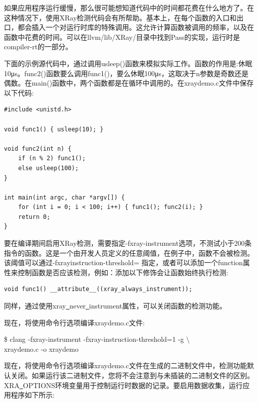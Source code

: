 
如果应用程序运行缓慢，那么很可能想知道代码中的时间都花费在什么地方了。在这种情况下，使用XRay检测代码会有所帮助。基本上，在每个函数的入口和出口，都会插入一个对运行时库的特殊调用。这允许计算函数被调用的频率，以及在函数中花费的时间。可以在llvm/lib/XRay/目录中找到Pass的实现，运行时是compiler-rt的一部分。\par

下面的示例源代码中，通过调用usleep()函数来模拟实际工作。函数的作用是:休眠10μs。func2()函数要么调用func1()，要么休眠100μs，这取决于n参数是奇数还是偶数。在main()函数中，两个函数都是在循环中调用的。在xraydemo.c文件中保存以下代码:\par

\begin{lstlisting}[caption={}]
#include <unistd.h>

void func1() { usleep(10); }

void func2(int n) {
	if (n % 2) func1();
	else usleep(100);
}

int main(int argc, char *argv[]) {
	for (int i = 0; i < 100; i++) { func1(); func2(i); }
	return 0;
}
\end{lstlisting}

要在编译期间启用XRay检测，需要指定-fxray-instrument选项，不测试小于200条指令的函数。这是一个由开发人员定义的任意阈值，在例子中，函数不会被检测。该阈值可以通过-fxrayin\allowbreak struction-threshold= 指定，或者可以添加一个function属性来控制函数是否应该检测，例如：添加以下修饰会让函数始终执行检测:\par

\begin{lstlisting}[caption={}]
void func1() __attribute__((xray_always_instrument));
\end{lstlisting}

同样，通过使用xray\underline{~}never\underline{~}instrument属性，可以关闭函数的检测功能。\par

现在，将使用命令行选项编译xraydemo.c文件:

\begin{tcolorbox}[colback=white,colframe=black]
\$ clang -fxray-instrument -fxray-instruction-threshold=1 -g $\setminus$ \\
\hspace*{1cm}xraydemo.c -o xraydemo
\end{tcolorbox}

现在，将使用命令行选项编译xraydemo.c文件在生成的二进制文件中，检测功能默认关闭。如果运行该二进制文件，您将不会注意到与未插装的二进制文件的区别。XRA\underline{~}OPTIONS环境变量用于控制运行时数据的记录。要启用数据收集，运行应用程序如下所示:\par

